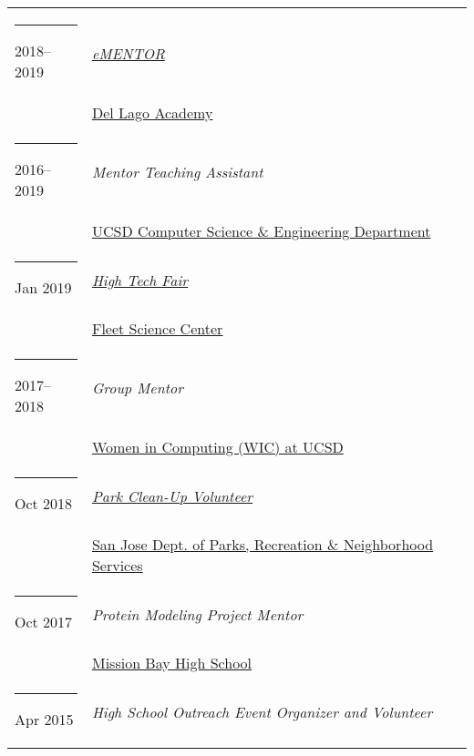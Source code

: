 \documentclass[margin,line]{res}
\begin{document}
\begin{resume}
\begin{longtable}{@{}p{0.7in}p{4in}}
\hspace*{-4mm} \rule{-1mm}{5mm} 2018--2019 & \href{https://www.dellagoacademy.org/apps/pages/index.jsp?uREC_ID=1248617&type=d&pREC_ID=1474743}{\textit{eMENTOR}}\\*
\hspace*{-4mm} & \hspace{4mm} \href{https://www.dellagoacademy.org/}{Del Lago Academy}\\
\hspace*{-4mm} \rule{-1mm}{5mm} 2016--2019 & \textit{Mentor Teaching Assistant}\\*
\hspace*{-4mm} & \hspace{4mm} \href{https://cse.ucsd.edu/}{UCSD Computer Science \& Engineering Department}\\
\hspace*{-4mm} \rule{-1mm}{5mm} Jan 2019 & \href{https://www.rhfleet.org/events/high-tech-fair}{\textit{High Tech Fair}}\\*
\hspace*{-4mm} & \hspace{4mm} \href{https://www.rhfleet.org/}{Fleet Science Center}\\
\hspace*{-4mm} \rule{-1mm}{5mm} 2017--2018 & \textit{Group Mentor}\\*
\hspace*{-4mm} & \hspace{4mm} \href{http://wic.ucsd.edu/}{Women in Computing (WIC) at UCSD}\\
\hspace*{-4mm} \rule{-1mm}{5mm} Oct 2018 & \href{http://sanjoseca.gov/DocumentCenter/View/77567}{\textit{Park Clean-Up Volunteer}}\\*
\hspace*{-4mm} & \hspace{4mm} \href{http://www.sanjoseca.gov/index.aspx?NID=204}{San Jose Dept. of Parks, Recreation \& Neighborhood Services}\\
\hspace*{-4mm} \rule{-1mm}{5mm} Oct 2017 & \textit{Protein Modeling Project Mentor}\\*
\hspace*{-4mm} & \hspace{4mm} \href{https://www.sandiegounified.org/schools/mission-bay}{Mission Bay High School}\\
\hspace*{-4mm} \rule{-1mm}{5mm} Apr 2015 & \textit{High School Outreach Event Organizer and Volunteer}\\*

\end{longtable}
\end{resume}
\end{document}
